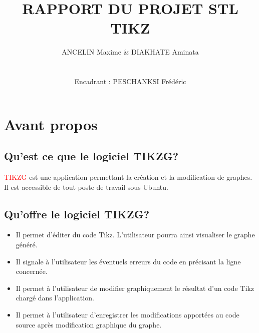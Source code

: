 \documentclass[a4paper]{report}
\title{RAPPORT DU PROJET STL \\ TIKZ}
\author{ANCELIN Maxime & DIAKHATE Aminata \\ \\ \\ Encadrant : PESCHANKSI Frédéric}
\begin{document}
\maketitle


\newpage
\section{Avant propos}
\subsection{Qu'est ce que le logiciel TIKZG?}
\textcolor{red}{TIKZG} est une application permettant la création et la modification de graphes. Il est accessible de tout poste de travail sous Ubuntu.

\subsection{Qu'offre le logiciel TIKZG?}
\begin{itemize}
 \item Il permet d'éditer du code Tikz. L'utilisateur pourra ainsi visualiser le graphe généré.
 \item Il signale à l'utilisateur les éventuels erreurs du code en précisant la ligne concernée.
 \item Il permet à l'utilisateur de modifier graphiquement le résultat d'un code Tikz chargé dans l'application.
 \item Il permet à l'utilisateur d'enregistrer les modifications apportées au code source après modification graphique du graphe.
\end{itemize}
\begin{center} \end{center}
\end{document}
